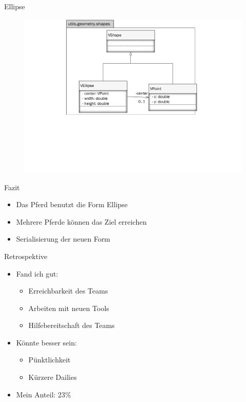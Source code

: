 \begin{frame}{Ellipse}
	\begin{figure}
		\includegraphics[width=\textwidth, keepaspectratio]{appendix/uml/Ellipse.pdf}
	\end{figure}
\end{frame}

\begin{frame}{Fazit}
	\begin{itemize}
		\item Das Pferd benutzt die Form Ellipse 
		\item Mehrere Pferde können das Ziel erreichen
		\item Serialisierung der neuen Form
	\end{itemize}
\end{frame}

\begin{frame}{Retrospektive}
	\begin{itemize}
		\item{Fand ich gut:}
		\begin{itemize}
			\item{Erreichbarkeit des Teams}
			\item{Arbeiten mit neuen Tools}
			\item{Hilfebereitschaft des Teams}
		\end{itemize}
		\item{Könnte besser sein:}
		\begin{itemize}
			\item{Pünktlichkeit}
			\item{Kürzere Dailies}
		\end{itemize}
		\item{Mein Anteil: 23\%}
	\end{itemize}
\end{frame}